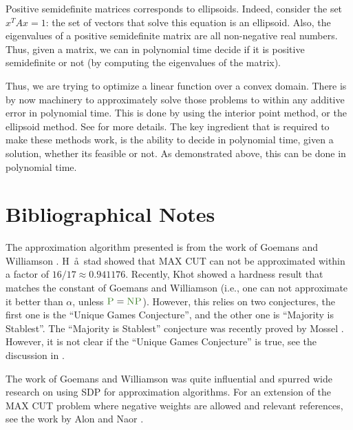 Positive semidefinite matrices corresponds to ellipsoids. Indeed,
consider the set $x^T A x = 1$: the set of vectors that solve this
equation is an ellipsoid. Also, the eigenvalues of a positive
semidefinite matrix are all non-negative real numbers. Thus, given a
matrix, we can in polynomial time decide if it is positive
semidefinite or not (by computing the eigenvalues of the matrix).

Thus, we are trying to optimize a linear function over a convex
domain. There is by now machinery to approximately solve those
problems to within any additive error in polynomial time. This is done
by using the interior point method, or the ellipsoid method. See
\cite{bv-co-04,gls-gaco-93} for more details. The key ingredient that
is required to make these methods work, is the ability to decide in
polynomial time, given a solution, whether its feasible or not. As
demonstrated above, this can be done in polynomial time.





\section{Bibliographical Notes}

The approximation algorithm presented is from the work of Goemans and
Williamson \cite{gw-iaamc-95}. \si{H{\r{a}}\si{stad}} \cite{h-soir}
showed that MAX CUT can not be approximated within a factor of
$16/17 \approx 0.941176$. Recently, Khot \etal \cite{kkmo-oirmc-04}
showed a hardness result that matches the constant of Goemans and
Williamson (i.e., one can not approximate it better than $\alpha$,
unless $\ComplexityClass{P}=\NP$). However, this relies on two
conjectures, the first one is the ``Unique Games Conjecture'', and the
other one is ``Majority is Stablest''. The ``Majority is Stablest''
conjecture was recently proved by Mossel \etal \cite{moo-nsfl-05}.
However, it is not clear if the ``Unique Games Conjecture'' is true,
see the discussion in \cite{kkmo-oirmc-04}.

The work of Goemans and Williamson was quite influential and spurred
wide research on using SDP for approximation algorithms.  For an
extension of the MAX CUT problem where negative weights are allowed
and relevant references, see the work by Alon and Naor
\cite{an-acnge-04}.



\ChapterEnd{}

%
